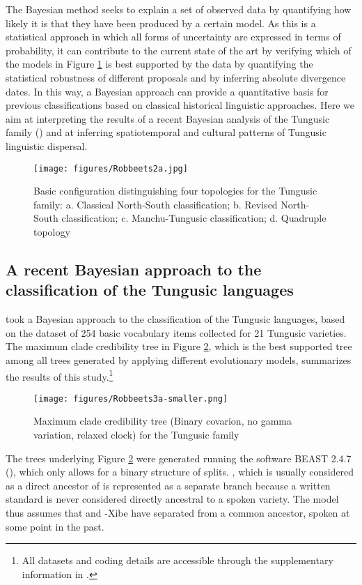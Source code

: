 \documentclass[output=paper,colorlinks,citecolor=brown]{langscibook}
\begin{document}
The Bayesian method seeks to explain a set of observed data by quantifying how likely it is that they have been produced by a certain model. As this is a statistical approach in which all forms of uncertainty are expressed in terms of probability, it can contribute to the current state of the art by verifying which of the models in Figure \ref{fig:8:2} is best supported by the data by quantifying the statistical robustness of  different proposals and by inferring absolute divergence dates. In this way, a Bayesian approach can provide a quantitative basis for previous classifications based on classical historical linguistic approaches. Here we aim at interpreting the results of a recent Bayesian analysis of the Tungusic family (\citealt{Oskolskayaetal2022}) and at inferring spatiotemporal and cultural patterns of Tungusic linguistic dispersal.

\begin{figure}
\texttt{[image: figures/Robbeets2a.jpg]}
\caption{Basic configuration distinguishing four topologies for the Tungusic family: a. Classical North-South classification; b. Revised North-South classification; c. Manchu-Tungusic classification; d. Quadruple topology}
\label{fig:8:2}
\end{figure}

\subsection{A recent Bayesian approach to the classification of the Tungusic languages}\label{Section8.2.2}

\citet{Oskolskayaetal2022} took a Bayesian approach to the classification of the Tungusic languages, based on the dataset of 254 basic vocabulary items collected for 21 Tungusic varieties. The maximum clade credibility tree in Figure \ref{fig:8:3}, which is the best supported tree among all trees generated by applying different evolutionary models, summarizes the results of this study.\footnote{All datasets and coding details are accessible through the supplementary information in \citet{Oskolskayaetal2022}.}

\begin{figure}
\texttt{[image: figures/Robbeets3a-smaller.png]}
\caption{Maximum clade credibility tree (Binary covarion, no gamma variation, relaxed clock) for the Tungusic family \citep{Oskolskayaetal2022}}
\label{fig:8:3}
\end{figure}


The trees underlying Figure \ref{fig:8:3} were generated running the software BEAST 2.4.7 (\citealt{Bouckaert2014}), which only allows for a binary structure of splits. , which is usually considered as a direct ancestor of  is represented as a separate branch because a written standard is never considered directly ancestral to a spoken variety. The model thus assumes that  and -Xibe have separated from a common ancestor, spoken at some point in the past.
\end{document}

